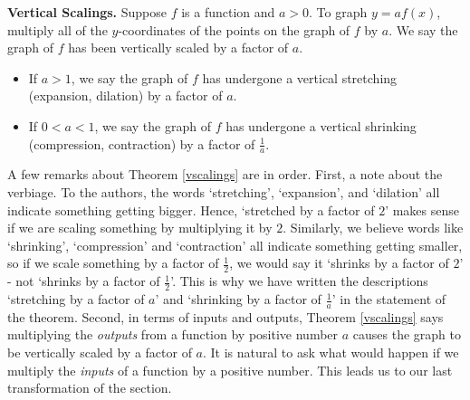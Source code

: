 \begin{thm} \label{vscalings}\textbf{Vertical Scalings.}  Suppose $f$ is a function and $a>0$.  To graph $y=a f(x)$, multiply all of the $y$-coordinates of the points on the graph of $f$ by $a$.  We say the graph of $f$ has been vertically scaled by a factor of $a$. 

\begin{itemize}

\item If $a > 1$, we say the graph of $f$ has undergone a vertical stretching (expansion, dilation) by a factor of $a$. 

\item If $0 < a < 1$, we say the graph of $f$ has undergone a vertical shrinking (compression, contraction) by a factor of $\frac{1}{a}$.

\end{itemize}

\end{thm}

\ebm


A few remarks about Theorem \ref{vscalings} are in order.  First, a note about the verbiage.  To the authors, the words `stretching', `expansion', and `dilation' all indicate something getting bigger.  Hence, `stretched by a factor of $2$' makes sense if we are scaling something by multiplying it by $2$.  Similarly, we believe words like `shrinking', `compression' and `contraction' all indicate something getting smaller, so if we scale something by a factor of $\frac{1}{2}$, we would say it `shrinks by a factor of $2$' - not `shrinks by a factor of $\frac{1}{2}$'.  This is why we have written the descriptions `stretching by a factor of $a$' and `shrinking by a factor of $\frac{1}{a}$' in the statement of the theorem.  Second, in terms of inputs and outputs, Theorem \ref{vscalings} says multiplying the \textit{outputs} from a function by positive number $a$ causes the graph to be vertically scaled by a factor of $a$.  It is natural to ask what would happen if we multiply the \textit{inputs} of a function by a positive number.  This leads us to our last transformation of the section.

\smallskip

